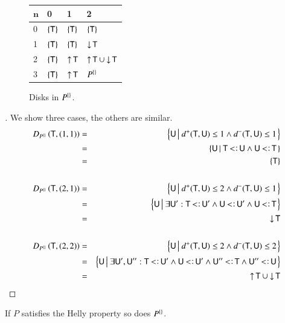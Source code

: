 \documentclass{report}
\begin{document}
  \begin{figure}[ht]
    \centering
    \begin{tabular}[c]{l|lll}
      $\mathbf{n}$ & 0 & 1 & 2 \\
      \hline
      0  & $\left\{\textsf{T}\right\}$ & $\left\{\textsf{T}\right\}$ & $\left\{\textsf{T}\right\}$ \\
      1  & $\left\{\textsf{T}\right\}$ & $\left\{\textsf{T}\right\}$ & $\mathop{\rm\downarrow}\nolimits{\textsf{T}}$ \\
      2  & $\left\{\textsf{T}\right\}$ & $\mathop{\rm\uparrow}\nolimits{\textsf{T}}$ & $\mathop{\rm\uparrow}\nolimits{\textsf{T}}\cup\mathop{\rm\downarrow}\nolimits{\textsf{T}}$ \\
      3  & $\left\{\textsf{T}\right\}$ & $\mathop{\rm\uparrow}\nolimits{\textsf{T}}$ & $P^{\{\}}$
    \end{tabular}
    \caption{Disks in $P^{\{\}}$.}
  \end{figure}
  \begin{proof}[]
    We show three cases, the others are similar.
    \begin{eqnarray*}
      D_{P^\rec}\lrp{\type{T}, (1, 1)}
        &=& \coll{\type{U}}{d^+(\type{T},\type{U})\le 1\land d^-(\type{T},\type{U})\le 1}\\
        &=& \coll{\type{U}}{\type{T}\subtype\type{U}\land\type{U}\subtype\type{T}}\\
        &=& \set{\type{T}}\\
        &&\\
      D_{P^\rec}\lrp{\type{T}, (2, 1)}
        &=& \coll{\type{U}}{d^+(\type{T},\type{U})\le 2\land d^-(\type{T},\type{U})\le 1}\\
        &=& \coll{\type{U}}{\exists\type{U}':\type{T}\subtype\type{U}'\land\type{U}\subtype\type{U}'\land\type{U}\subtype\type{T}}\\
        &=& \downclosure{\type{T}}\\
        &&\\
      D_{P^\rec}\lrp{\type{T}, (2, 2)}
        &=& \coll{\type{U}}{d^+(\type{T},\type{U})\le 2\land d^-(\type{T},\type{U})\le 2}\\
        &=& \coll{\type{U}}{\exists\type{U}',\type{U}'':\type{T}\subtype\type{U}'\land\type{U}\subtype\type{U}'\land\type{U}''\subtype\type{T}\land\type{U}''\subtype\type{U}}\\
        &=& \upclosure{\type{T}}\cup\downclosure{\type{T}}
    \end{eqnarray*}
  \end{proof}
  \begin{thm}
    If $P$ satisfies the Helly property so does $P^{\{\}}$.
  \end{thm}
\end{document}

